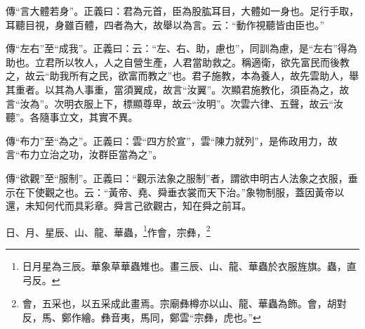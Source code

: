 {\noindent\zhuan{}\fzbyks 傳“言大體若身”。正義曰：君為元首，臣為股肱耳目，大體如一身也。足行手取，耳聽目視，身雖百體，四者為大，故舉以為言。云：“動作視聽皆由臣也。” \par}

{\noindent\zhuan{}\fzbyks 傳“左右”至“成我”。正義曰：云：“左、右、助，慮也”，同訓為慮，是“左右”得為助也。立君所以牧人，人之自營生產，人君當助救之。稱適衛，欲先富民而後教之，故云“助我所有之民，欲富而教之”也。君子施教，本為養人，故先雲助人，舉其重者。以其為人事重，當須翼成，故言“汝翼”。次顯君施教化，須臣為之，故言“汝為”。次明衣服上下，標顯尊卑，故云“汝明”。次雲六律、五聲，故云“汝聽”。各隨事立文，其實不異。 \par}

{\noindent\zhuan{}\fzbyks 傳“布力”至“為之”。正義曰：雲“四方於宣”，雲“陳力就列”，是佈政用力，故言“布力立治之功，汝群臣當為之”。 \par}

{\noindent\zhuan{}\fzbyks 傳“欲觀”至“服制”。正義曰：“觀示法象之服制”者，謂欲申明古人法象之衣服，垂示在下使觀之也。云：“黃帝、堯、舜垂衣裳而天下治。”象物制服，蓋因黃帝以還，未知何代而具彩章。舜言己欲觀古，知在舜之前耳。 \par}

日、月、星辰、山、龍、華蟲，\footnote{日月星為三辰。華象草華蟲雉也。畫三辰、山、龍、華蟲於衣服旌旗。蟲，直弓反。}作會，宗彝，\footnote{會，五采也，以五采成此畫焉。宗廟彝樽亦以山、龍、華蟲為飾。會，胡對反，馬、鄭作繪。彝音夷，馬同，鄭雲“宗彝，虎也。”}


